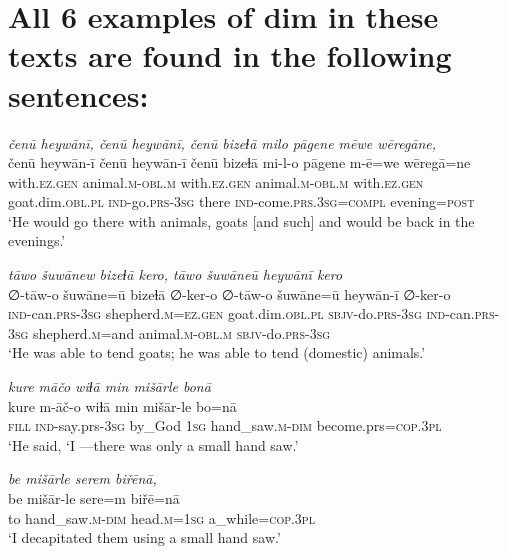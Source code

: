 \chapter{All 6 examples of dim in these texts are found in the following sentences:}

\ea \label{ZP.12}
\textit{čenū heywānī, čenū heywānī, čenū bizeɫā milo pāgene mēwe wēregāne,} \\ 
\gll čenū heywān-ī čenū heywān-ī čenū bizeɫā mi-l-o pāgene m-ē=we wēregā=ne \\ 
 with\textsc{.ez.gen} animal\textsc{.m}\textsc{-obl}\textsc{.m} with\textsc{.ez.gen} animal\textsc{.m}\textsc{-obl}\textsc{.m} with\textsc{.ez.gen} goat.dim\textsc{.obl}\textsc{.pl} \textsc{ind-}go\textsc{.prs}\textsc{-3sg} there \textsc{ind-}come\textsc{.prs}\textsc{.3sg}\textsc{=compl} evening\textsc{=\textsc{post}} \\ 
\glt `He would go there with animals, goats [and such] and would be back in the evenings.'
\z 
 
\ea \label{ŽP.16}
\textit{tāwo šuwānew bizeɫā kero, tāwo šuwāneū heywānī kero} \\ 
\gll ∅-tāw-o šuwāne=ū bizeɫā ∅-ker-o ∅-tāw-o šuwāne=ū heywān-ī ∅-ker-o \\ 
 \textsc{ind-}can\textsc{.prs}\textsc{-3sg} shepherd\textsc{.m}\textsc{\textsc{=ez.gen}} goat.dim\textsc{.obl}\textsc{.pl} \textsc{sbjv-}do\textsc{.prs}\textsc{-3sg} \textsc{ind-}can\textsc{.prs}\textsc{-3sg} shepherd\textsc{.m}=and animal\textsc{.m}\textsc{-obl}\textsc{.m} \textsc{sbjv-}do\textsc{.prs}\textsc{-3sg} \\ 
\glt `He was able to tend goats; he was able to tend (domestic) animals.'
\z 
 
\ea \label{BP.82}
\textit{kure māčo wiɫā min mišārle bonā} \\ 
\gll kure m-āč-o wiɫā min mišār-le bo=nā \\ 
 \textsc{fill} \textsc{ind-}say.prs\textsc{-3sg} by\_God \textsc{1sg} hand\_saw\textsc{.m}\textsc{-dim} become.prs\textsc{=cop}\textsc{.3pl} \\ 
\glt `He said, ‘I —there was only a small hand saw.'
\z 
 
\ea \label{BP.84}
\textit{be mišārle serem biřēnā,} \\ 
\gll be mišār-le sere=m biřē=nā \\ 
 to hand\_saw\textsc{.m}\textsc{-dim} head\textsc{.m}\textsc{=\textsc{1sg}} a\_while\textsc{=cop}\textsc{.3pl} \\ 
\glt `I decapitated them using a small hand saw.'
\z 
 
